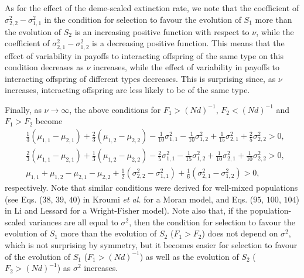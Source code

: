 \documentclass[11pt]{article}
\begin{document}
As for the effect of the deme-scaled extinction rate, we note that the coefficient of  $\sigma^2_{2,2}-\sigma^2_{1,1}$ in the condition for selection to favour the evolution of $S_1$ more than the evolution of $S_2$ is an increasing positive function with respect to $\nu$, while the coefficient of $\sigma^2_{2,1}-\sigma^2_{1,2}$ is a decreasing positive function. This means that the effect of variability in payoffs to interacting offspring of the same type on this condition decreases as $\nu$ increases, while the effect of variability in payoffs to interacting offspring of different types decreases. This is surprising since, as $\nu$ increases, interacting offspring are less likely to be of the same type. %




Finally, as $\nu\rightarrow\infty$, the above conditions for $F_1>(Nd)^{-1}$, $F_2<(Nd)^{-1}$ and $F_1>F_2$ become 
\begin{subequations}
\begin{align}
&\frac{1}{3}(\mu_{1,1}-\mu_{2,1})+\frac{2}{3}(\mu_{1,2}-\mu_{2,2})-\frac{1}{10}\sigma^2_{1,1}-\frac{1}{10}\sigma^2_{1,2}+\frac{1}{15}\sigma^2_{2,1}+\frac{2}{5}\sigma^2_{2,2}>0,\\
&\frac{2}{3}(\mu_{1,1}-\mu_{2,1})+\frac{1}{3}(\mu_{1,2}-\mu_{2,2})-\frac{2}{5}\sigma^2_{1,1}-\frac{1}{15}\sigma^2_{1,2}+\frac{1}{10}\sigma^2_{2,1}+\frac{1}{10}\sigma^2_{2,2}>0,\\
&\mu_{1,1}+\mu_{1,2}-\mu_{2,1}-\mu_{2,2}
+\frac{1}{2}(\sigma^2_{2,2}-\sigma^2_{1,1})+\frac{1}{6}(\sigma^2_{2,1}-\sigma^2_{1,2})
>0,
\end{align}
\end{subequations}
respectively.
Note that similar conditions were derived for well-mixed populations (see Eqs. ($38$, $39$, $40$) in Kroumi \textit{et al.} \cite{KMLL2021} for a Moran model, and Eqs. ($95$, $100$, $104$) in Li and Lessard \cite{LL2020} for a Wright-Fisher model). Note also that, if the population-scaled variances are all equal to $\sigma^2$, then the condition for selection to favour the evolution of $S_1$ more than the evolution of $S_2$ ($F_1>F_2$) does not depend on $\sigma^2$, which is not surprising by symmetry, but it becomes easier for selection to favour of the evolution of $S_1$ ($F_1>(Nd)^{-1}$) as well as the evolution of $S_2$  ($F_2>(Nd)^{-1}$) as $\sigma^2$ increases.%
\end{document}
